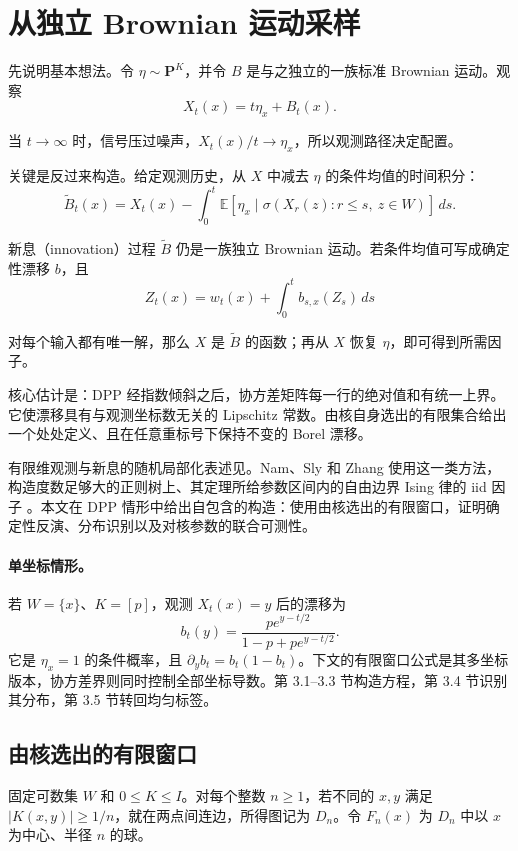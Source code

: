 \documentclass[UTF8,zihao=-4,a4paper]{ctexart}
\numberwithin{equation}{section}
\begin{document}
\section{从独立 Brownian 运动采样}

先说明基本想法。令 \(\eta\sim\mathbf P^K\)，并令 \(B\) 是与之独立的一族标准 Brownian 运动。观察
\[
 X_t(x)=t\eta_x+B_t(x).
\]

当 \(t\to\infty\) 时，信号压过噪声，\(X_t(x)/t\to\eta_x\)，所以观测路径决定配置。

关键是反过来构造。给定观测历史，从 \(X\) 中减去 \(\eta\) 的条件均值的时间积分：
\[
 \widetilde B_t(x)
 =X_t(x)-\int_0^t
    \mathbb E[\eta_x\mid \sigma(X_r(z):r\le s,\ z\in W)]\,ds.
\]

新息（innovation）过程 \(\widetilde B\) 仍是一族独立 Brownian 运动。若条件均值可写成确定性漂移 \(b\)，且
\[
 Z_t(x)=w_t(x)+\int_0^t b_{s,x}(Z_s)\,ds
\]

对每个输入都有唯一解，那么 \(X\) 是 \(\widetilde B\) 的函数；再从 \(X\) 恢复 \(\eta\)，即可得到所需因子。

核心估计是：DPP 经指数倾斜之后，协方差矩阵每一行的绝对值和有统一上界。它使漂移具有与观测坐标数无关的 Lipschitz 常数。由核自身选出的有限集合给出一个处处定义、且在任意重标号下保持不变的 Borel 漂移。

有限维观测与新息的随机局部化表述见\cite[\S3]{EM}。Nam、Sly 和 Zhang 使用这一类方法，构造度数足够大的正则树上、其定理所给参数区间内的自由边界 Ising 律的 iid 因子 \cite[Theorem 1 and Section 2.2]{NSZ}。本文在 DPP 情形中给出自包含的构造：使用由核选出的有限窗口，证明确定性反演、分布识别以及对核参数的联合可测性。

\paragraph{单坐标情形。}
若 \(W=\{x\}\)、\(K=[p]\)，观测 \(X_t(x)=y\) 后的漂移为
\[
 b_t(y)=\frac{p e^{y-t/2}}{1-p+p e^{y-t/2}}.
\]
它是 \(\eta_x=1\) 的条件概率，且 \(\partial_y b_t=b_t(1-b_t)\)。下文的有限窗口公式是其多坐标版本，协方差界则同时控制全部坐标导数。第 3.1--3.3 节构造方程，第 3.4 节识别其分布，第 3.5 节转回均匀标签。

\subsection{由核选出的有限窗口}

固定可数集 \(W\) 和 \(0\le K\le I\)。对每个整数 \(n\ge1\)，若不同的 \(x,y\) 满足
\(|K(x,y)|\ge1/n\)，就在两点间连边，所得图记为 \(D_n\)。令 \(F_n(x)\) 为 \(D_n\) 中以 \(x\) 为中心、半径 \(n\) 的球。
\end{document}
